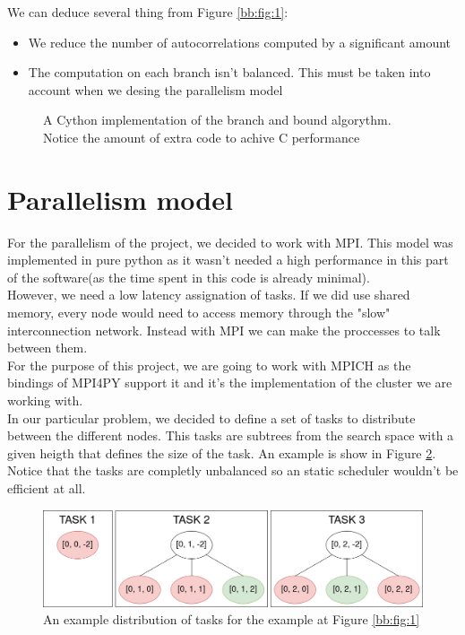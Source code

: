   We can deduce several thing from Figure \ref{bb:fig:1}:
  \begin{itemize}
    \item We reduce the number of autocorrelations computed by a significant amount
    \item The computation on each branch isn't balanced. This must be taken into
    account when we desing the parallelism model
  \end{itemize}

  \begin{figure}[ht!]
    \caption{A Cython implementation of the branch and bound algorythm. Notice
    the amount of extra code to achive C performance}
    \label{composite_auto:fig:1}
  \end{figure}


  \section{Parallelism model}

  For the parallelism of the project, we decided to work with MPI. This model
  was implemented in pure python as it wasn't needed a high performance in
  this part of the software(as the time spent in this code is already
  minimal).\\

  However, we need a low latency assignation of tasks. If we did use shared
  memory, every node would need to access memory through the "slow"
  interconnection network. Instead with MPI we can make the proccesses to
  talk between them.\\

  For the purpose of this project, we are going to work with
  MPICH\cite{mpich} as the bindings of MPI4PY support it and it's
  the implementation of the cluster we are working with\cite{calderon}.\\

  In our particular problem, we decided to define a set of tasks to
  distribute between the different nodes. This tasks are subtrees from the
  search space with a given heigth that defines the size of the task. An
  example is show in Figure \ref{tasks:fig:1}. Notice that the tasks are
  completly unbalanced so an static scheduler wouldn't be efficient at all.\\


  \begin{figure}[ht!]
    \begin{center}
      \includegraphics[scale=0.4]{Chapters/Implementation/Example_tasks.png}
    \end{center}
    \caption{An example distribution of tasks for the example at Figure
    \ref{bb:fig:1}}
    \label{tasks:fig:1}
  \end{figure}

